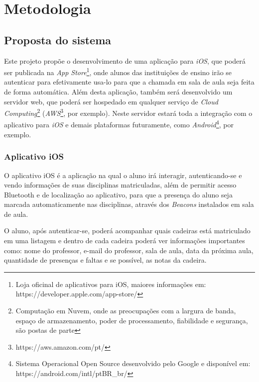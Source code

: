 \documentclass[
	12pt,
	oneside,
	a4paper,
	english,
	brazil,
]{abntex2}
\begin{document}

\chapter{Metodologia}
\section{Proposta do sistema}

Este projeto propõe o desenvolvimento de uma aplicação para \emph{iOS}, que poderá ser publicada na \emph{App Store}\footnote{Loja oficinal de aplicativos para iOS, maiores informações em: https://developer.apple.com/app-store/}, onde alunos das instituições de ensino irão se autenticar para efetivamente usa-lo para que a chamada em sala de aula seja feita de forma automática. Além desta aplicação, também será desenvolvido um servidor web, que poderá ser hospedado em qualquer serviço de \emph{Cloud Computing}\footnote{Computação em Nuvem, onde as preocupações com a largura de banda, espaço de armazenamento, poder de processamento, fiabilidade e segurança, são postas de parte\cite{cloud-computing-about}} (\emph{AWS}\footnote{https://aws.amazon.com/pt/}, por exemplo). Neste servidor estará toda a integração com o aplicativo para \emph{iOS} e demais plataformas futuramente, como \emph{Android}\footnote{Sistema Operacional Open Source desenvolvido pelo Google e disponível em: https://android.com/intl/pt\-BR\_br/}, por exemplo.

\subsection{Aplicativo iOS}

O aplicativo iOS é a aplicação na qual o aluno irá interagir, autenticando-se e vendo informações de suas disciplinas matriculadas, além de permitir acesso Bluetooth e de localização ao aplicativo, para que a presença do aluno seja marcada automaticamente nas disciplinas, através dos \emph{Beacons} instalados em sala de aula.

O aluno, após autenticar-se, poderá acompanhar quais cadeiras está matriculado em uma listagem e dentro de cada cadeira poderá ver informações importantes como: nome do professor, e-mail do professor, sala de aula, data da próxima aula, quantidade de presenças e faltas e se possível, as notas da cadeira.
\end{document}
